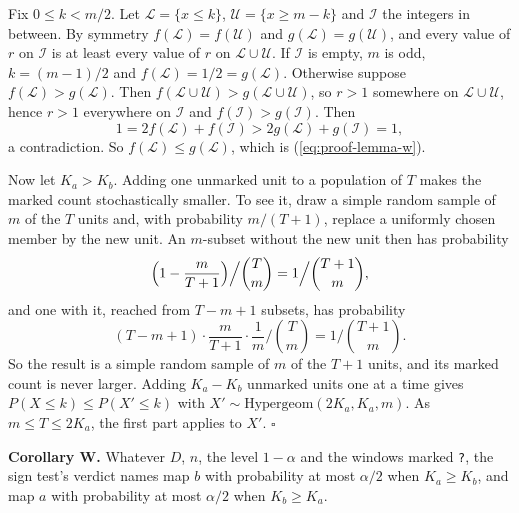 \documentclass[11pt,a4paper]{article}
\newcommand{\code}[1]{\texttt{#1}}
\begin{document}
Fix $0 \le k < m/2$. Let $\mathcal{L} = \{x \le k\}$, $\mathcal{U} = \{x \ge m - k\}$ and $\mathcal{I}$ the integers
in between. By symmetry $f(\mathcal{L}) = f(\mathcal{U})$ and $g(\mathcal{L}) = g(\mathcal{U})$, and every value of
$r$ on $\mathcal{I}$ is at least every value of $r$ on $\mathcal{L} \cup \mathcal{U}$. If $\mathcal{I}$ is empty, $m$
is odd, $k = (m-1)/2$ and $f(\mathcal{L}) = 1/2 = g(\mathcal{L})$. Otherwise suppose
$f(\mathcal{L}) > g(\mathcal{L})$. Then $f(\mathcal{L} \cup \mathcal{U}) > g(\mathcal{L} \cup \mathcal{U})$, so
$r > 1$ somewhere on $\mathcal{L} \cup \mathcal{U}$, hence $r > 1$ everywhere on $\mathcal{I}$ and
$f(\mathcal{I}) > g(\mathcal{I})$. Then
\[
  1 = 2f(\mathcal{L}) + f(\mathcal{I}) > 2g(\mathcal{L}) + g(\mathcal{I}) = 1,
\]
a contradiction. So $f(\mathcal{L}) \le g(\mathcal{L})$, which is (\ref{eq:proof-lemma-w}).

Now let $K_a > K_b$. Adding one unmarked unit to a population of $T$ makes the marked count stochastically smaller.
To see it, draw a simple random sample of $m$ of the $T$ units and, with probability $m/(T+1)$, replace a uniformly
chosen member by the new unit. An $m$-subset without the new unit then has probability
\[
  \Bigl(1 - \frac{m}{T+1}\Bigr) \Big/ \binom{T}{m} = 1 \Big/ \binom{T+1}{m},
\]
and one with it, reached from $T - m + 1$ subsets, has probability
\[
  (T - m + 1) \cdot \frac{m}{T+1} \cdot \frac{1}{m} \Big/ \binom{T}{m} = 1 \Big/ \binom{T+1}{m}.
\]
So the result is a simple random sample of $m$ of the $T + 1$ units, and its marked count is never larger. Adding
$K_a - K_b$ unmarked units one at a time gives $P(X \le k) \le P(X' \le k)$ with
$X' \sim \mathrm{Hypergeom}(2K_a, K_a, m)$. As $m \le T \le 2K_a$, the first part applies to $X'$. $\square$

\textbf{Corollary W.} Whatever $D$, $n$, the level $1 - \alpha$ and the windows marked \code{?}, the sign test's
verdict names map $b$ with probability at most $\alpha/2$ when $K_a \ge K_b$, and map $a$ with probability at most
$\alpha/2$ when $K_b \ge K_a$.
\end{document}
